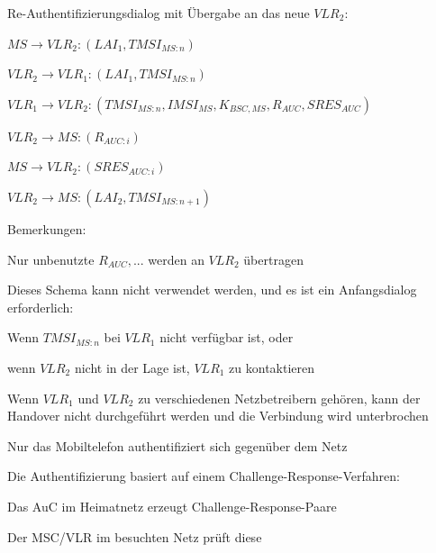 \documentclass[a4paper]{article}
\begin{document}
\begin{multicols}{3}
\begin{itemize*}
\begin{itemize*}
            \end{itemize*}
            \item Re-Authentifizierungsdialog mit Übergabe an das neue $VLR_2$:
            \begin{enumerate*}
                  \item $MS \rightarrow VLR_2: (LAI_1, TMSI_{MS:n})$
                  \item $VLR_2 \rightarrow VLR_1: (LAI_1, TMSI_{MS:n})$
                  \item $VLR_1 \rightarrow VLR_2: (TMSI_{MS:n}, IMSI_{MS}, K_{BSC,MS}, R_{AUC}, SRES_{AUC})$
                  \item $VLR_2 \rightarrow MS: (R_{AUC:i})$
                  \item $MS \rightarrow VLR_2: (SRES_{AUC:i})$
                  \item $VLR_2 \rightarrow MS: (LAI_2, TMSI_{MS:n+1})$
            \end{enumerate*}
            \item Bemerkungen:
            \begin{itemize*}
                  \item Nur unbenutzte $R_{AUC}, ...$ werden an $VLR_2$ übertragen
                  \item Dieses Schema kann nicht verwendet werden, und es ist ein Anfangsdialog erforderlich:
                  \begin{itemize*}
                        \item Wenn $TMSI_{MS:n}$ bei $VLR_1$ nicht verfügbar ist, oder
                        \item wenn $VLR_2$ nicht in der Lage ist, $VLR_1$ zu kontaktieren
                  \end{itemize*}
                  \item Wenn $VLR_1$ und $VLR_2$ zu verschiedenen Netzbetreibern gehören, kann der Handover nicht durchgeführt werden und die Verbindung wird unterbrochen
            \end{itemize*}
            \item Nur das Mobiltelefon authentifiziert sich gegenüber dem Netz
            \item Die Authentifizierung basiert auf einem Challenge-Response-Verfahren:
            \begin{itemize*}
                  \item Das AuC im Heimatnetz erzeugt Challenge-Response-Paare
                  \item Der MSC/VLR im besuchten Netz prüft diese

\end{itemize*}
\end{itemize*}
\end{multicols}
\end{document}
